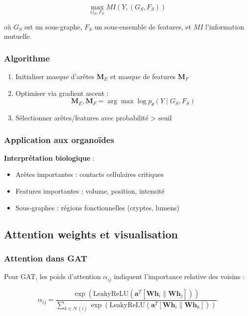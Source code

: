 \[
\max_{G_S, F_S} MI(Y, (G_S, F_S))
\]

où $G_S$ est un sous-graphe, $F_S$ un sous-ensemble de features, et $MI$ l'information mutuelle.

\subsubsection{Algorithme}

\begin{enumerate}
    \item Initialiser masque d'arêtes $\mathbf{M}_E$ et masque de features $\mathbf{M}_F$
    \item Optimiser via gradient ascent :
    \[
    \mathbf{M}_E, \mathbf{M}_F = \arg\max \log p_\theta(Y \mid G_S, F_S)
    \]
    \item Sélectionner arêtes/features avec probabilité > seuil
\end{enumerate}

\subsubsection{Application aux organoïdes}

\textbf{Interprétation biologique} :
\begin{itemize}
    \item Arêtes importantes : contacts cellulaires critiques
    \item Features importantes : volume, position, intensité
    \item Sous-graphes : régions fonctionnelles (cryptes, lumens)
\end{itemize}

\subsection{Attention weights et visualisation}

\subsubsection{Attention dans GAT}

Pour GAT, les poids d'attention $\alpha_{ij}$ indiquent l'importance relative des voisins :

\[
\alpha_{ij} = \frac{\exp(\text{LeakyReLU}(\mathbf{a}^T [\mathbf{W}\mathbf{h}_i \| \mathbf{W}\mathbf{h}_j]))}{\sum_{k \in \mathcal{N}(i)} \exp(\text{LeakyReLU}(\mathbf{a}^T [\mathbf{W}\mathbf{h}_i \| \mathbf{W}\mathbf{h}_k]))}
\]

